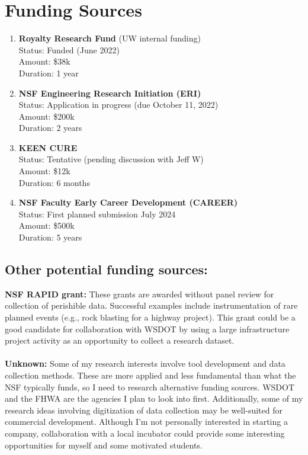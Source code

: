 \documentclass[10pt,letterpaper]{article}
\begin{document}
\section{Funding Sources}
\begin{enumerate}
\item \textbf{Royalty Research Fund} (UW internal funding)\\ 
Status: Funded (June 2022)\\
Amount: \$38k\\
Duration: 1 year
\item \textbf{NSF Engineering Research Initiation (ERI)}\\
Status: Application in progress (due October 11, 2022)\\
Amount: \$200k\\
Duration: 2 years
\item \textbf{KEEN CURE}\\
Status: Tentative (pending discussion with Jeff W)\\
Amount: \$12k\\
Duration: 6 months
\item \textbf{NSF Faculty Early Career Development (CAREER)}\\
Status: First planned submission July 2024\\
Amount: \$500k\\
Duration: 5 years

\end{enumerate}
\subsection*{Other potential funding sources:}

\textbf{NSF RAPID grant:} These grants are awarded without panel review for collection of perishible data. Successful examples include instrumentation of rare planned events (e.g., rock blasting for a highway project). 
This grant could be a good candidate for collaboration with WSDOT by using a large infrastructure project activity as an opportunity to collect a research dataset.
\\
\\
\noindent \textbf{Unknown:} Some of my research interests involve tool development and data collection methods.
These are more applied and less fundamental than what the NSF typically funds, so I need to research alternative funding sources. 
WSDOT and the FHWA are the agencies I plan to look into first.
Additionally, some of my research ideas involving digitization of data collection may be well-suited for commercial development. 
Although I'm not personally interested in starting a company, collaboration with a local incubator could provide some interesting opportunities for myself and some motivated students.
\end{document}
